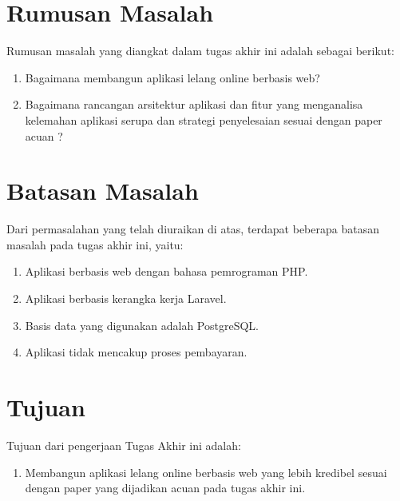   \section{Rumusan Masalah}
    Rumusan masalah yang diangkat dalam tugas akhir ini adalah sebagai berikut: 
    \begin{enumerate}
      \item Bagaimana membangun aplikasi lelang online berbasis web?
      \item Bagaimana rancangan arsitektur aplikasi dan fitur yang menganalisa kelemahan aplikasi serupa dan strategi penyelesaian sesuai dengan paper acuan \cite{ying-feng_kuo_online_2016}?
    \end{enumerate}

  \section{Batasan Masalah}
  	\label{batasan-masalah}
    Dari permasalahan yang telah diuraikan di atas, terdapat beberapa batasan masalah pada tugas akhir ini, yaitu:
    \begin{enumerate}
      \item Aplikasi berbasis web dengan bahasa pemrograman PHP.
      \item Aplikasi berbasis kerangka kerja Laravel.
      \item Basis data yang digunakan adalah PostgreSQL.
      \item Aplikasi tidak mencakup proses pembayaran.
    \end{enumerate}

  \section{Tujuan}
  \label{tujuan}
    Tujuan dari pengerjaan Tugas Akhir ini adalah: 
    \begin{enumerate}
      \item Membangun aplikasi lelang online berbasis web yang lebih kredibel sesuai dengan paper yang dijadikan acuan pada tugas akhir ini. 
    \end{enumerate}
    
    
